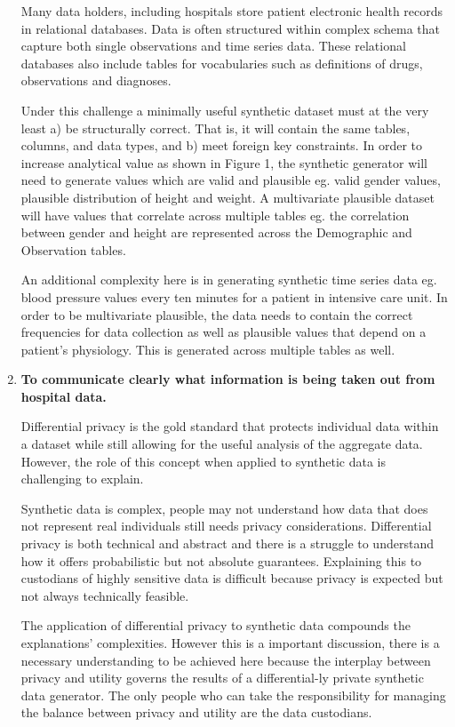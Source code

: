 \documentclass[11pt]{article}
\begin{document}
\begin{enumerate}[leftmargin=*]
    Many data holders, including hospitals store patient electronic health records in relational databases. Data is often structured within complex schema that capture both single observations and time series data. These relational databases also include tables for vocabularies such as definitions of drugs, observations and diagnoses. 

    Under this challenge a minimally useful synthetic dataset must at the very least a) be structurally correct. That is, it will contain the same tables, columns, and data types, and b) meet foreign key constraints. In order to increase analytical value as shown in Figure 1, the synthetic generator will need to generate values which are valid and plausible eg. valid gender values, plausible distribution of height and weight.  A multivariate plausible dataset will have values that correlate across multiple tables eg. the correlation between gender and height are represented across the Demographic and Observation tables. 
    
    An additional complexity here is in generating synthetic time series data eg. blood pressure values every ten minutes for a patient in intensive care unit. In order to be multivariate plausible, the data needs to contain the correct frequencies for data collection as well as plausible values that depend on a patient's physiology. This is generated across multiple tables as well.  

    \item \textbf{To communicate clearly what information is being taken out from hospital data.
    }
    
    Differential privacy is the gold standard that protects individual data within a dataset while still allowing for the useful analysis of the aggregate data. However, the role of this concept when applied to synthetic data is challenging to explain. 
    
    Synthetic data is complex, people may not understand how data that does not represent real individuals still needs privacy considerations. Differential privacy is both technical and abstract and there is a struggle to understand how it offers probabilistic but not absolute guarantees. Explaining this to custodians of highly sensitive data is difficult because privacy is expected but not always technically feasible.
    
    The application of differential privacy to synthetic data compounds the explanations' complexities. However this is a important discussion, there is a necessary understanding to be achieved here because the interplay between privacy and utility governs the results of a differential-ly private synthetic data generator. The only people who can take the responsibility for managing the balance between privacy and utility are the data custodians.
\end{enumerate}
\end{document}
